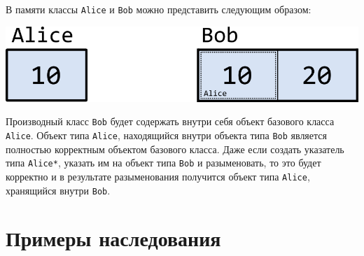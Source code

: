 \documentclass{article}
\begin{document}
В памяти классы \texttt{Alice} и \texttt{Bob} можно представить следующим образом:
\begin{center}
\includegraphics[scale=1]{../images/alice_bob_in_memory.png}
\end{center}
Производный класс \texttt{Bob} будет содержать внутри себя объект базового класса \texttt{Alice}. Объект типа \texttt{Alice}, находящийся внутри объекта типа \texttt{Bob} является полностью корректным объектом базового класса. Даже если создать указатель типа \texttt{Alice*}, указать им на объект типа \texttt{Bob} и разыменовать, то это будет корректно и в результате разыменования получится объект типа \texttt{Alice}, хранящийся внутри \texttt{Bob}.


\section{Примеры наследования}
\end{document}
